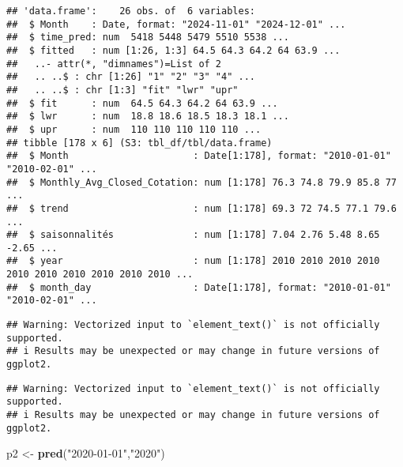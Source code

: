 \documentclass[
]{article}
\newenvironment{Shaded}{\begin{snugshade}}{\end{snugshade}}
\newcommand{\FunctionTok}[1]{\textcolor[rgb]{0.13,0.29,0.53}{\textbf{#1}}}
\newcommand{\NormalTok}[1]{#1}
\newcommand{\OtherTok}[1]{\textcolor[rgb]{0.56,0.35,0.01}{#1}}
\newcommand{\StringTok}[1]{\textcolor[rgb]{0.31,0.60,0.02}{#1}}
\begin{document}
\begin{verbatim}
## 'data.frame':    26 obs. of  6 variables:
##  $ Month    : Date, format: "2024-11-01" "2024-12-01" ...
##  $ time_pred: num  5418 5448 5479 5510 5538 ...
##  $ fitted   : num [1:26, 1:3] 64.5 64.3 64.2 64 63.9 ...
##   ..- attr(*, "dimnames")=List of 2
##   .. ..$ : chr [1:26] "1" "2" "3" "4" ...
##   .. ..$ : chr [1:3] "fit" "lwr" "upr"
##  $ fit      : num  64.5 64.3 64.2 64 63.9 ...
##  $ lwr      : num  18.8 18.6 18.5 18.3 18.1 ...
##  $ upr      : num  110 110 110 110 110 ...
## tibble [178 x 6] (S3: tbl_df/tbl/data.frame)
##  $ Month                      : Date[1:178], format: "2010-01-01" "2010-02-01" ...
##  $ Monthly_Avg_Closed_Cotation: num [1:178] 76.3 74.8 79.9 85.8 77 ...
##  $ trend                      : num [1:178] 69.3 72 74.5 77.1 79.6 ...
##  $ saisonnalités              : num [1:178] 7.04 2.76 5.48 8.65 -2.65 ...
##  $ year                       : num [1:178] 2010 2010 2010 2010 2010 2010 2010 2010 2010 2010 ...
##  $ month_day                  : Date[1:178], format: "2010-01-01" "2010-02-01" ...
\end{verbatim}

\begin{verbatim}
## Warning: Vectorized input to `element_text()` is not officially supported.
## i Results may be unexpected or may change in future versions of ggplot2.
\end{verbatim}

\begin{verbatim}
## Warning: Vectorized input to `element_text()` is not officially supported.
## i Results may be unexpected or may change in future versions of ggplot2.
\end{verbatim}

\begin{Shaded}
\begin{Highlighting}[]
\NormalTok{p2 }\OtherTok{\textless{}{-}} \FunctionTok{pred}\NormalTok{(}\StringTok{"2020{-}01{-}01"}\NormalTok{,}\StringTok{"2020"}\NormalTok{)  }
\end{Highlighting}
\end{Shaded}
\end{document}
